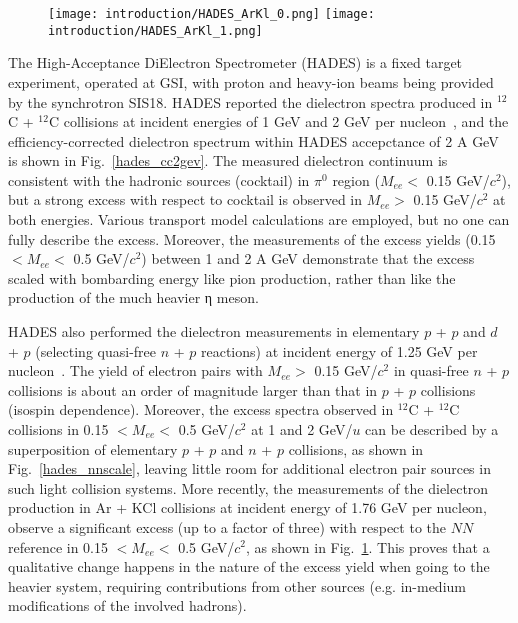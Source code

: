 \begin{figure}[htbp]
\centering
\texttt{[image: introduction/HADES\_ArKl\_0.png]}
\texttt{[image: introduction/HADES\_ArKl\_1.png]}
\label{hades_arkcl}
\end{figure}
  
The High-Acceptance DiElectron Spectrometer (HADES) is a fixed target experiment, operated at GSI, with proton and heavy-ion beams being provided by the synchrotron SIS18. HADES reported the dielectron spectra produced in $^{12}$C + $^{12}$C collisions at incident energies of 1 GeV and 2 GeV per nucleon~\cite{HADES:dielectron0,HADES:dielectron1}, and the efficiency-corrected dielectron spectrum within HADES accepctance of 2 A GeV is shown in Fig.~\ref{hades_cc2gev}. The measured dielectron continuum is consistent with the hadronic sources (cocktail) in $\pi^{0}$ region ($M_{ee}<$ 0.15 GeV/$c^{2}$), but a strong excess with respect to cocktail is observed in $M_{ee}>$ 0.15 GeV/$c^{2}$ at both energies. Various transport model calculations are employed, but no one can fully describe the excess. Moreover, the measurements of the excess yields (0.15 $<M_{ee}<$ 0.5 GeV/$c^{2}$) between 1 and 2 A GeV demonstrate that the excess scaled with bombarding energy like pion production, rather than like the production of the much heavier η meson. 
 
HADES also performed the dielectron measurements in elementary $p$ + $p$ and $d$ + $p$ (selecting quasi-free $n$ + $p$ reactions) at incident energy of 1.25 GeV per nucleon~\cite{HADES:dielectron2}. The yield of electron pairs with $M_{ee}>$ 0.15 GeV/$c^{2}$ in quasi-free $n$ + $p$ collisions is about an order of magnitude larger than that in $p$ + $p$ collisions (isospin dependence). Moreover, the excess spectra observed in $^{12}$C + $^{12}$C collisions in 0.15 $<M_{ee}<$ 0.5 GeV/$c^{2}$ at 1 and 2 GeV/$u$ can be described by a superposition of elementary $p$ + $p$ and $n$ + $p$ collisions, as shown in Fig.~\ref{hades_nnscale}, leaving little room for additional electron pair sources in such light collision systems. More recently, the measurements of the dielectron production in Ar + KCl collisions at incident energy of 1.76 GeV per nucleon, observe a significant excess (up to a factor of three) with respect to the $NN$ reference in 0.15 $<M_{ee}<$ 0.5 GeV/$c^{2}$, as shown in Fig.~\ref{hades_arkcl}. This proves that a qualitative change happens in the nature of the excess yield when going to the heavier system, requiring contributions from other sources (e.g. in-medium modifications of the involved hadrons).

